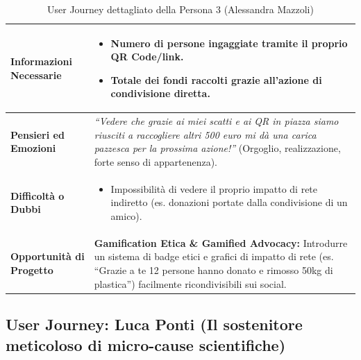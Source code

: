 \documentclass[11pt,a4paper]{article}
\begin{document}
\begin{table}[h!]
\begin{tabular}{|p{3.2cm}|p{11.8cm}|}
\textbf{Informazioni Necessarie} &
\begin{itemize}[leftmargin=*,nosep]
    \item Numero di persone ingaggiate tramite il proprio QR Code/link.
    \item Totale dei fondi raccolti grazie all'azione di condivisione diretta.
\end{itemize} \\ \hline
\textbf{Pensieri ed Emozioni} &
\textit{``Vedere che grazie ai miei scatti e ai QR in piazza siamo riusciti a raccogliere altri 500 euro mi dà una carica pazzesca per la prossima azione!''} (Orgoglio, realizzazione, forte senso di appartenenza). \\ \hline
\textbf{Difficoltà o Dubbi} &
\begin{itemize}[leftmargin=*,nosep]
    \item Impossibilità di vedere il proprio impatto di rete indiretto (es. donazioni portate dalla condivisione di un amico).
\end{itemize} \\ \hline
\textbf{Opportunità di Progetto} &
\textbf{Gamification Etica \& Gamified Advocacy:} Introdurre un sistema di badge etici e grafici di impatto di rete (es. ``Grazie a te 12 persone hanno donato e rimosso 50kg di plastica'') facilmente ricondivisibili sui social. \\ \hline
\end{tabular}
\caption{User Journey dettagliato della Persona 3 (Alessandra Mazzoli)}
\label{tab:user_journey_alessandra}
\end{table}


\subsection{User Journey: Luca Ponti (Il sostenitore meticoloso di micro-cause scientifiche)}
\end{document}
